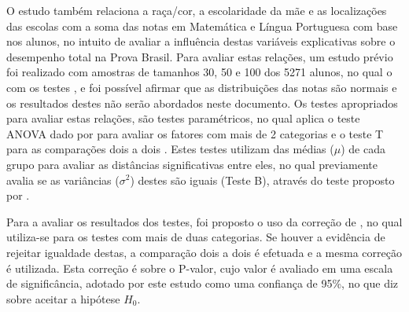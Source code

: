 O estudo também relaciona a raça/cor, a escolaridade da mãe e as localizações das escolas com a soma das notas em Matemática 
e Língua Portuguesa com base nos alunos, no intuito de avaliar a influência destas variáveis explicativas sobre o desempenho
total na Prova Brasil. Para avaliar estas relações, um estudo prévio foi realizado com amostras de tamanhos 30, 50 e 100 dos 5271
alunos, no qual o com os testes ,  e 
foi possível afirmar que as distribuições das notas são normais e os resultados destes não serão abordados neste documento. Os testes 
apropriados para avaliar estas relações, são testes paramétricos, no qual aplica o teste ANOVA dado por  para 
avaliar os fatores com mais de 2 categorias e o teste T para as comparações dois a dois \cite{o1908student}.
Estes testes utilizam das médias ($\mu$) de cada grupo para avaliar as distâncias significativas entre eles, no qual previamente avalia se as
variâncias ($\sigma^2$) destes são iguais (Teste B), através do teste proposto por .

Para a avaliar os resultados dos testes, foi proposto o uso da correção de , no qual utiliza-se para os 
testes com mais de duas categorias. Se houver a evidência de rejeitar igualdade destas, a comparação dois a dois é efetuada e a mesma correção
é utilizada. Esta correção é sobre o P-valor, cujo valor é avaliado em uma escala de significância, adotado por este estudo
como uma confiança de 95\%, no que diz sobre aceitar a hipótese $H_0$.